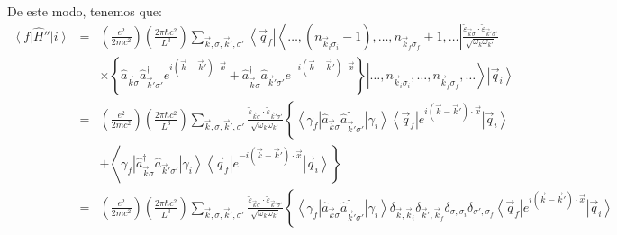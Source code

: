 De este modo, tenemos que:
\begin{eqnarray}
\left\langle f\right| \hat{H}''\left| i\right\rangle  &=&\left(
\frac{e^2}{2mc^2}\right) \left( \frac{2\pi\hbar c^2}{L^3}\right)
\sum_{\vec{k},\sigma,\vec{k}',\sigma '}\left\langle \vec{q}_f\right|
\left\langle
\dots,(n_{\vec{k}_i\sigma_i}-1),\dots,n_{\vec{k}_f\sigma_f}+1,
\dots\right| \frac{\check
{\varepsilon}_{\vec{k}\sigma}\cdot\check{\varepsilon}_{\vec{k}'\sigma'}}{\sqrt{
\omega_k\omega_{k'}}} \nonumber\\
&& \times\left\{ \hat{a}_{\vec{k}\sigma}\hat{a}_{\vec{k}'\sigma
'}^\dagger e^{i\left(
\vec{k}-\vec{k}'\right)\cdot\vec{x}}+\hat{a}_{\vec{k}\sigma}^\dagger \hat{a}_{
\vec{k}'\sigma'}e^{-i\left(\vec{k}-\vec{k}'\right)\cdot\vec{x}}\right\}
\left|\dots,n_{\vec{k}_i\sigma_i},\dots,n_{\vec{k}_f\sigma_f},
\dots\right\rangle  \left| \vec{q}_i\right\rangle  \\
& = &\left( \frac{e^2}{2mc^2}\right) \left( \frac{2\pi\hbar
c^2}{L^3}\right)\sum_{\vec{k},\sigma,\vec{k}',\sigma'}\frac{\check{
\varepsilon}_{\vec{k}\sigma}\cdot\check{\varepsilon}_{\vec{k}'\sigma
'}}{\sqrt{\omega_k\omega_{k'}}}\left\{\left\langle \gamma_f\right|
\hat{a}_{\vec{k}\sigma}\hat{a}_{\vec{k}'\sigma '}^\dagger \left|
\gamma_i\right\rangle  \left\langle \vec{q}_f\right| e^{i\left(
\vec{k}-\vec{k}'\right) \cdot\vec{x}}\left| \vec{q}_i\right\rangle  
\right.\nonumber\\
&&+\left\langle\left.  \gamma_f\right|
\hat{a}_{\vec{k}\sigma}^\dagger \hat{a}_{\vec{k}'\sigma '}\left|
\gamma_i\right\rangle  \left\langle \vec{q}_f\right| e^{-i\left(
\vec{k}-\vec{k}'\right) \cdot\vec{x}}\left| \vec{q}_i\right\rangle \right\}\\
& = &\left( \frac{e^2}{2mc^2}\right) \left( \frac{2\pi\hbar c^2}{L^3}\right)
\sum_{\vec{k},\sigma,\vec{k}',\sigma'}\frac{\check{\varepsilon}_{\vec{k}\sigma}
\cdot\check{\varepsilon}_{\vec{k}'\sigma
'}}{\sqrt{\omega_k\omega_{k'}}}\left\{\left\langle \gamma_f\right|
\hat{a}_{\vec{k}\sigma}\hat{a}_{\vec{k}'\sigma '}^\dagger \left|
\gamma_i\right\rangle 
\delta_{\vec{k},\vec{k}_i}\delta_{\vec{k}',\vec{k}_f}\delta_{\sigma,\sigma_i}
\delta_{\sigma ',\sigma_f}\left\langle \vec{q}_f\right| e^{i\left(
\vec{k}-\vec{k}'\right) \cdot\vec{x}}\left| \vec{q}_i\right\rangle  \right.
\nonumber\\

\end{eqnarray}
